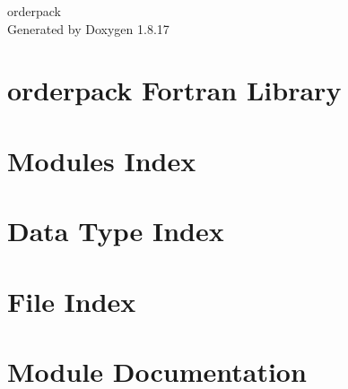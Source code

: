 \let\mypdfximage\pdfximage\def\pdfximage{\immediate\mypdfximage}\documentclass[twoside]{book}
\newcommand{\+}{\discretionary{\mbox{\scriptsize$\hookleftarrow$}}{}{}}
\newcommand{\clearemptydoublepage}{%
  \newpage{\pagestyle{empty}\cleardoublepage}%
}
\begin{document}
\hypersetup{pageanchor=false,
             bookmarksnumbered=true,
             pdfencoding=unicode
            }
\begin{titlepage}
\vspace*{7cm}
\begin{center}%
{\Large orderpack }\\
\vspace*{1cm}
{\large Generated by Doxygen 1.8.17}\\
\end{center}
\end{titlepage}
\clearemptydoublepage
{}
\tableofcontents
\clearemptydoublepage
{}
\hypersetup{pageanchor=true}

\chapter{orderpack Fortran Library}
\label{index}\hypertarget{index}{}
\chapter{Modules Index}

\chapter{Data Type Index}

\chapter{File Index}

\chapter{Module Documentation}





















\end{document}
